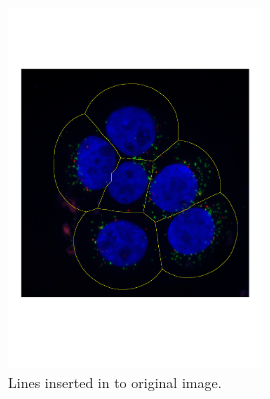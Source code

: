 \documentclass[10pt,twocolumn]{article}
\begin{document}
\begin{figure}[ht]
\centering
\includegraphics[width=0.6\textwidth]{Bilder/CellLines.pdf}
\caption{Lines inserted in to original image.}
\label{fig:CellLines}
\end{figure}
\end{document}
